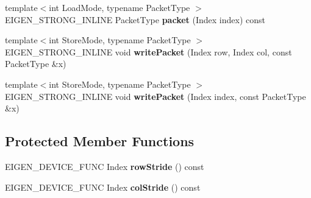 \begin{DoxyCompactItemize}
\item 
\mbox{\label{struct_eigen_1_1internal_1_1mapbase__evaluator_a783c32aa529b4b3085190eef66fb2039}} 
{\footnotesize template$<$int Load\+Mode, typename Packet\+Type $>$ }\\E\+I\+G\+E\+N\+\_\+\+S\+T\+R\+O\+N\+G\+\_\+\+I\+N\+L\+I\+NE Packet\+Type {\bfseries packet} (Index index) const
\item 
\mbox{\label{struct_eigen_1_1internal_1_1mapbase__evaluator_a4b7f13fced92d667256c097caccfba90}} 
{\footnotesize template$<$int Store\+Mode, typename Packet\+Type $>$ }\\E\+I\+G\+E\+N\+\_\+\+S\+T\+R\+O\+N\+G\+\_\+\+I\+N\+L\+I\+NE void {\bfseries write\+Packet} (Index row, Index col, const Packet\+Type \&x)
\item 
\mbox{\label{struct_eigen_1_1internal_1_1mapbase__evaluator_ad86d8fc9ce0db49235ab5c80ba380ab1}} 
{\footnotesize template$<$int Store\+Mode, typename Packet\+Type $>$ }\\E\+I\+G\+E\+N\+\_\+\+S\+T\+R\+O\+N\+G\+\_\+\+I\+N\+L\+I\+NE void {\bfseries write\+Packet} (Index index, const Packet\+Type \&x)
\end{DoxyCompactItemize}
\subsection*{Protected Member Functions}
\begin{DoxyCompactItemize}
\item 
\mbox{\label{struct_eigen_1_1internal_1_1mapbase__evaluator_a16a5a69b900487af930bcdaef6881c1d}} 
E\+I\+G\+E\+N\+\_\+\+D\+E\+V\+I\+C\+E\+\_\+\+F\+U\+NC Index {\bfseries row\+Stride} () const
\item 
\mbox{\label{struct_eigen_1_1internal_1_1mapbase__evaluator_aab4179c764a64617f409ec9fb1c710c8}} 
E\+I\+G\+E\+N\+\_\+\+D\+E\+V\+I\+C\+E\+\_\+\+F\+U\+NC Index {\bfseries col\+Stride} () const
\end{DoxyCompactItemize}
